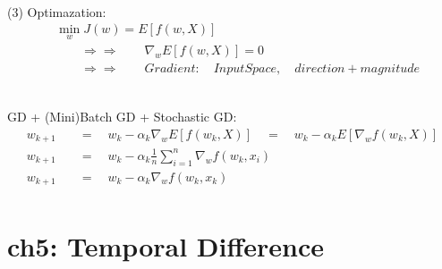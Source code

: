 \documentclass{article}
\begin{document}
~ \\[3pt]
(3) Optimazation: 
\begin{align*}
    & \min_{w} J(w) = E [ f(w, X) ] \\[3pt]
    & \qquad \Rightarrow \Rightarrow \qquad 
    \nabla_{w} E [ f(w, X) ] = 0 \\[3pt]
    & \qquad \Rightarrow \Rightarrow \qquad 
    Gradient: \quad InputSpace, \quad direction + magnitude 
\end{align*}


~ \\[3pt]
GD \quad + \quad (Mini)Batch GD \quad + \quad Stochastic GD: 
\begin{align*}
    w_{k+1} & 
            \quad = \quad w_{k} - \alpha_{k} 
            \nabla_{w} E [ f(w_{k}, X) ] 
            \quad = \quad w_{k} - \alpha_{k} 
            E [ \nabla_{w} f(w_{k}, X) ] \\[3pt]
    w_{k+1} & 
            \quad = \quad w_{k} - \alpha_{k} 
            \frac {1} {n} \sum_{i=1}^{n} 
            \nabla_{w} f(w_{k}, x_{i}) \\[3pt]
    w_{k+1} & 
            \quad = \quad w_{k} - \alpha_{k} 
            \nabla_{w} f(w_{k}, x_{k}) \\[3pt]
\end{align*}


\newpage
\section*{ch5: Temporal Difference}
\end{document}
